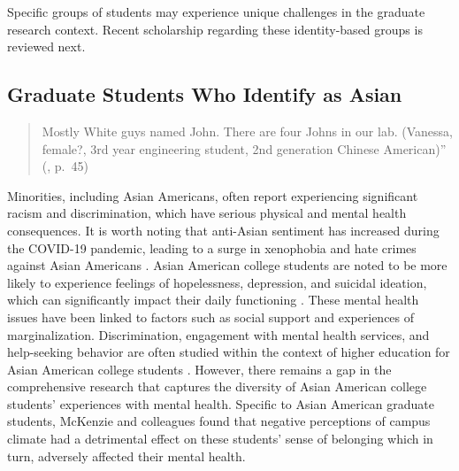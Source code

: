 \documentclass[
  11pt,
]{book}
\begin{document}
Specific groups of students may experience unique challenges in the graduate research context. Recent scholarship regarding these identity-based groups is reviewed next.

\subsection{Graduate Students Who Identify as Asian}\label{graduate-students-who-identify-as-asian}

\begin{quote}
Mostly White guys named John. There are four Johns in our lab. (Vanessa, female?, 3rd year engineering student, 2nd generation Chinese American)'' (\citet{castro_asian_2021}, p.~45)
\end{quote}

Minorities, including Asian Americans, often report experiencing significant racism and discrimination, which have serious physical and mental health consequences. It is worth noting that anti-Asian sentiment has increased during the COVID-19 pandemic, leading to a surge in xenophobia and hate crimes against Asian Americans \citep{hwang_demystifying_2021}. Asian American college students are noted to be more likely to experience feelings of hopelessness, depression, and suicidal ideation, which can significantly impact their daily functioning \citep{mckenzie_campus_2024}. These mental health issues have been linked to factors such as social support and experiences of marginalization. Discrimination, engagement with mental health services, and help-seeking behavior are often studied within the context of higher education for Asian American college students \citep{mckenzie_campus_2024}. However, there remains a gap in the comprehensive research that captures the diversity of Asian American college students' experiences with mental health. Specific to Asian American graduate students, McKenzie and colleagues \citeyearpar{mckenzie_campus_2024} found that negative perceptions of campus climate had a detrimental effect on these students' sense of belonging which in turn, adversely affected their mental health.
\end{document}
